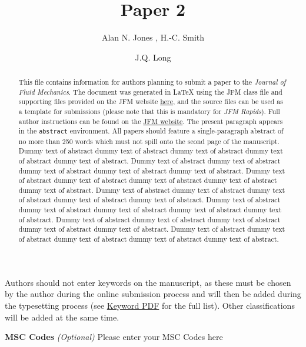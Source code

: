 \documentclass[lineno]{jfm}
\title{Paper 2}
\author{Alan N. Jones\aff{1}
  \corresp{\email{JFMEditorial@cambridge.org}},
  H.-C. Smith\aff{1}
 \and J.Q. Long\aff{2}}
\affiliation{\aff{1}STM Journals, Cambridge University Press, The Printing House, Shaftesbury Road, Cambridge CB2 8BS, UK
\aff{2}DAMTP, Centre for Mathematical Sciences, Wilberforce Road, Cambridge CB3 0WA, UK}
\begin{document}
\maketitle

\begin{abstract}
This file contains information for authors planning to submit a paper to the {\it Journal of Fluid Mechanics}. The document was generated in {\LaTeX} using the JFM class file and supporting files provided on the JFM website \href{https://www.cambridge.org/core/journals/journal-of-fluid-mechanics/information/author-instructions/preparing-your-materials}{here}, and the source files can be used as a template for submissions (please note that this is mandatory for {\it JFM Rapids}). Full author instructions can be found on the \href{https://www.cambridge.org/core/journals/journal-of-fluid-mechanics/information/author-instructions}{JFM website}. The present paragraph appears in the \verb}abstract} environment. All papers should feature a single-paragraph abstract of no more than 250 words which must not spill onto the seond page of the manuscript. Dummy text of abstract dummy text of abstract dummy text of abstract dummy text of abstract dummy text of abstract. Dummy text of abstract dummy text of abstract dummy text of abstract dummy text of abstract dummy text of abstract. Dummy text of abstract dummy text of abstract dummy text of abstract dummy text of abstract dummy text of abstract. Dummy text of abstract dummy text of abstract dummy text of abstract dummy text of abstract dummy text of abstract. Dummy text of abstract dummy text of abstract dummy text of abstract dummy text of abstract dummy text of abstract. Dummy text of abstract dummy text of abstract dummy text of abstract dummy text of abstract dummy text of abstract. Dummy text of abstract dummy text of abstract dummy text of abstract dummy text of abstract dummy text of abstract.
\end{abstract}

\begin{keywords}
Authors should not enter keywords on the manuscript, as these must be chosen by the author during the online submission process and will then be added during the typesetting process (see \href{https://www.cambridge.org/core/journals/journal-of-fluid-mechanics/information/list-of-keywords}{Keyword PDF} for the full list).  Other classifications will be added at the same time.
\end{keywords}

{\bf MSC Codes }  {\it(Optional)} Please enter your MSC Codes here
\end{document}
